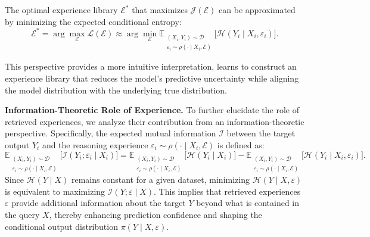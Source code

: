 \begin{corollary}
\label{cor:obj}
The optimal experience library $\mathcal{E}^*$ that maximizes $\mathcal{J}(\mathcal{E})$ can be approximated by minimizing the expected conditional entropy:
\begin{equation}
\mathcal{E}^* =
\arg\max_{\mathcal{E}}\mathcal{L}(\mathcal{E})
\approx 
\arg\min_{\mathcal{E}}
\mathbb{E}_{\substack{(X_i,Y_i)\sim\mathcal{D} \\ \varepsilon_i\sim\rho(\cdot\mid X_i,\mathcal{E})}}
\big[\mathcal{H}(Y_i \mid X_i, \varepsilon_i)\big].
\end{equation}
\end{corollary}
This perspective provides a more intuitive interpretation, \method{} learns to construct an experience library that reduces the model’s predictive uncertainty while aligning the model distribution with the underlying true distribution.

\textbf{Information-Theoretic Role of Experience.}
To further elucidate the role of retrieved experiences, we analyze their contribution from an information-theoretic perspective.
Specifically, the expected mutual information $\mathcal{I}$ between the target output $Y_i$ and the reasoning experience $\varepsilon_i\sim\rho(\cdot\mid X_i,\mathcal{E})$ is defined as:
\begin{equation}
\mathbb{E}_{\substack{(X_i,Y_i)\sim\mathcal{D} \\ \varepsilon_i\sim\rho(\cdot\mid X_i,\mathcal{E})}}
\big[\mathcal{I}(Y_i;\varepsilon_i\mid X_i)\big] =
\mathbb{E}_{\substack{(X_i,Y_i)\sim\mathcal{D} \\ \varepsilon_i\sim\rho(\cdot\mid X_i,\mathcal{E})}}
\big[\mathcal{H}(Y_i \mid X_i)\big] -
\mathbb{E}_{\substack{(X_i,Y_i)\sim\mathcal{D} \\ \varepsilon_i\sim\rho(\cdot\mid X_i,\mathcal{E})}}
\big[\mathcal{H}(Y_i \mid X_i, \varepsilon_i)\big].
\end{equation}
Since $\mathcal{H}(Y\mid X)$ remains constant for a given dataset, minimizing $\mathcal{H}(Y\mid X,\varepsilon)$ is equivalent to maximizing $\mathcal{I}(Y;\varepsilon\mid X)$. 
This implies that retrieved experiences $\varepsilon$ provide additional information about the target $Y$ beyond what is contained in the query $X$, thereby enhancing prediction confidence and shaping the conditional output distribution $\pi(Y\mid X,\varepsilon)$.

